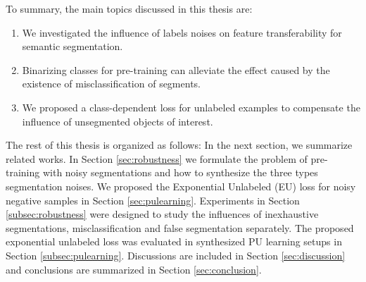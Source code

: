 
To summary, the main topics discussed in this thesis are:
\begin{enumerate}
  \item We investigated the influence of labels noises on feature transferability for semantic segmentation.
  \item Binarizing classes for pre-training can alleviate the effect caused by the existence of misclassification of segments.
  \item We proposed a class-dependent loss for unlabeled examples to compensate the influence of unsegmented objects of interest.
\end{enumerate}




The rest of this thesis is organized as follows:
In the next section, we summarize related works.
In Section \ref{sec:robustness} we formulate the problem of pre-training with noisy segmentations and how to synthesize the three types segmentation noises.
We proposed the Exponential Unlabeled (EU) loss for noisy negative samples in Section \ref{sec:pulearning}.
Experiments in Section \ref{subsec:robustness} were designed to study the influences of inexhaustive segmentations, misclassification and false segmentation separately.
The proposed exponential unlabeled loss was evaluated in synthesized PU learning setups in Section \ref{subsec:pulearning}.
Discussions are included in Section \ref{sec:discussion} and conclusions are summarized in Section \ref{sec:conclusion}.
